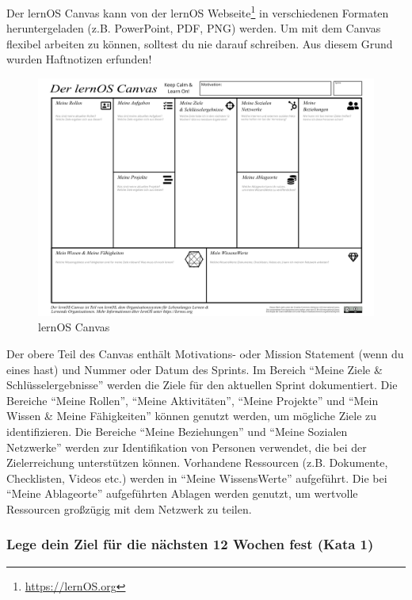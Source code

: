 \documentclass[
  ngerman,
  paper=a4,
,captions=tableheading
]{scrartcl}
\DeclareRobustCommand{\href}[2]{#2\footnote{\url{#1}}}
\begin{document}
Der lernOS Canvas kann von der \href{https://lernOS.org}{lernOS
Webseite} in verschiedenen Formaten heruntergeladen (z.B. PowerPoint,
PDF, PNG) werden. Um mit dem Canvas flexibel arbeiten zu können,
solltest du nie darauf schreiben. Aus diesem Grund wurden Haftnotizen
erfunden!

\begin{figure}
\centering
\includegraphics{./tex2pdf.-c0ed5a8631023970/a706e42b1eb1c1bbbe80e1109cff3eb164666bfd.png}
\caption{lernOS Canvas}
\end{figure}

Der obere Teil des Canvas enthält Motivations- oder Mission Statement
(wenn du eines hast) und Nummer oder Datum des Sprints. Im Bereich
``Meine Ziele \& Schlüsselergebnisse'' werden die Ziele für den
aktuellen Sprint dokumentiert. Die Bereiche ``Meine Rollen'', ``Meine
Aktivitäten'', ``Meine Projekte'' und ``Mein Wissen \& Meine
Fähigkeiten'' können genutzt werden, um mögliche Ziele zu
identifizieren. Die Bereiche ``Meine Beziehungen'' und ``Meine Sozialen
Netzwerke'' werden zur Identifikation von Personen verwendet, die bei
der Zielerreichung unterstützen können. Vorhandene Ressourcen (z.B.
Dokumente, Checklisten, Videos etc.) werden in ``Meine WissensWerte''
aufgeführt. Die bei ``Meine Ablageorte'' aufgeführten Ablagen werden
genutzt, um wertvolle Ressourcen großzügig mit dem Netzwerk zu teilen.

\hypertarget{lege-dein-ziel-fuxfcr-die-nuxe4chsten-12-wochen-fest-kata-1}{%
\subsubsection{Lege dein Ziel für die nächsten 12 Wochen fest (Kata
1)}\label{lege-dein-ziel-fuxfcr-die-nuxe4chsten-12-wochen-fest-kata-1}}
\end{document}
